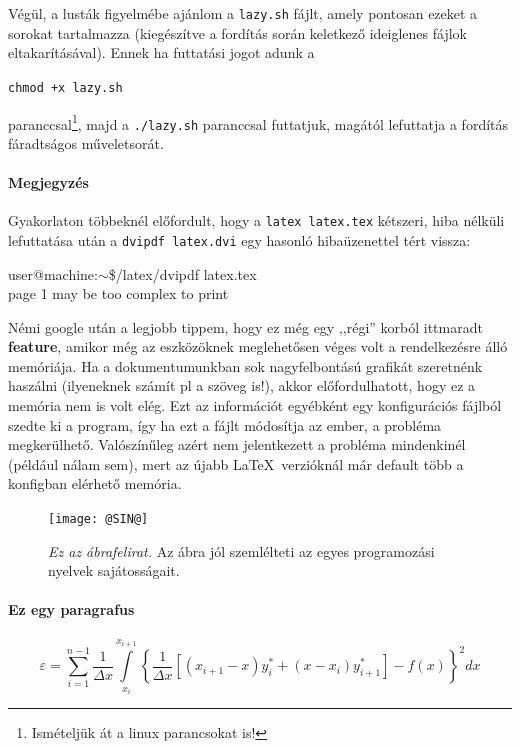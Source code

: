 \documentclass[a4paper, 12pt]{article}
\numberwithin{equation}{section}          %
\numberwithin{figure}{subsection}
\begin{document}
Végül, a lusták figyelmébe ajánlom a \texttt{lazy.sh} fájlt, amely pontosan ezeket a sorokat tartalmazza 
(kiegészítve a fordítás során keletkező ideiglenes fájlok eltakarításával). Ennek ha futtatási jogot adunk a 

\texttt{chmod +x lazy.sh}

paranccsal\footnote{Ismételjük át a linux parancsokat is!}, majd a \texttt{./lazy.sh} paranccsal futtatjuk, 
magától lefuttatja a fordítás fáradtságos műveletsorát.

\paragraph{Megjegyzés}
Gyakorlaton többeknél előfordult, hogy a \texttt{latex latex.tex} kétszeri, hiba nélküli lefuttatása után a 
\texttt{dvipdf latex.dvi} egy hasonló hibaüzenettel tért vissza: 

\noindent %
user@machine:$\sim$\$/latex/dvipdf latex.tex \\ %
page 1 may be too complex to print

Némi google után a legjobb tippem, hogy ez még egy ,,régi'' korból ittmaradt \textbf{feature}, amikor még az 
eszközöknek meglehetősen véges volt a rendelkezésre álló memóriája. Ha a dokumentumunkban sok nagyfelbontású 
grafikát szeretnénk haszálni (ilyeneknek számít pl a szöveg is!), akkor előfordulhatott, hogy ez a memória 
nem is volt elég. Ezt az információt egyébként egy konfigurációs fájlból szedte ki a program, így ha ezt a fájlt 
módosítja az ember, a probléma megkerülhető. Valószínűleg azért nem jelentkezett a probléma mindenkinél 
(például nálam sem), mert az újabb \LaTeX\ verzióknál már default több a konfigban elérhető memória.

\begin{figure}[h!]
\begin{center}
\texttt{[image: @SIN@]}
\end{center}
  \caption{\textit{Ez az ábrafelirat.} Az ábra jól szemlélteti az egyes programozási 
  nyelvek sajátosságait.}
\label{fig:abra}
\end{figure}

\paragraph{Ez egy paragrafus}
\lipsum[2-4]
\begin{equation}
  \varepsilon=\sum_{i=1}^{n-1} \frac{1}{\Delta x}\int\limits_{x_i}^{x_{i+1}}\left\{\frac{1}{\Delta x}
  \left[(x_{i+1}-x)y_i^*+(x-x_i)y_{i+1}^*\right]-f(x)\right\}^2dx
\end{equation}
\end{document}

